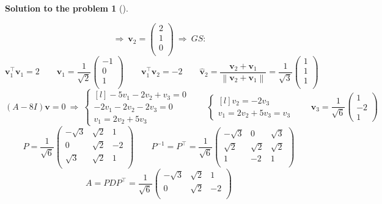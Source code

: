 \documentclass[12pt,a4]{article}
\newtheorem{solution}{Solution to the problem}
\newcommand{\norm}[1]{\left\lVert#1\right\rVert}
\newcommand{\bv}{{\mathbf v}}
\begin{document}
{\begin{solution}[]
\begin{enumerate}[(a)]
\[\]
\[
~ \Rightarrow ~
\bv_2 = 
\begin{pmatrix}
2\\ 1 \\ 0 \\
\end{pmatrix}
~ \Rightarrow ~ GS:
\]
\[
\bv_1^\top \bv_1 = 2
\qquad
\hat \bv_1 = \frac1{\sqrt2}
\begin{pmatrix}
-1\\ 0 \\ 1 \\
\end{pmatrix}
\qquad
\bv_1^\top \bv_2 = -2
\qquad
\hat \bv_2 = \frac{\bv_2 + \bv_1}{\norm{\bv_2 + \bv_1}}
=
\frac1{\sqrt3}
\begin{pmatrix}
1\\ 1 \\ 1 \\
\end{pmatrix}
\]
\[
(A - 8I)\bv = 0
~\Rightarrow~
\left \{ \begin{matrix}[l]
-5 v_1  -2 v_2 +  v_3 = 0\\ 
-2 v_1  -2 v_2 -2 v_3 = 0 \\
   v_1  = 2 v_2 + 5 v_3
\end{matrix} \right .
\qquad
\left \{ \begin{matrix}[l]
v_2 = - 2 v_3 \\ 
v_1  = 2 v_2 + 5 v_3 =v_3
\end{matrix} \right .
\qquad
\bv_3 = 
\frac1{\sqrt{6}}
\begin{pmatrix}
1 \\ -2 \\ 1
\end{pmatrix}
\]
\[
P = \frac1{\sqrt6}
\begin{pmatrix}
-\sqrt3 & \sqrt2 & 1\\
0 & \sqrt2 & -2 \\
\sqrt3 & \sqrt2 & 1\\
\end{pmatrix}
\qquad
P^{-1} = P^\top = \frac1{\sqrt6}
\begin{pmatrix}
-\sqrt3 & 0 & \sqrt3\\
\sqrt2 & \sqrt2 & \sqrt2 \\
1 & -2 & 1\\
\end{pmatrix}
\]
\[
A = PDP^\top =
\frac1{\sqrt6}
\begin{pmatrix}
-\sqrt3 & \sqrt2 & 1\\
0 & \sqrt2 & -2 \\

\end{pmatrix}\]
\end{enumerate}
\end{solution}}
\end{document}
